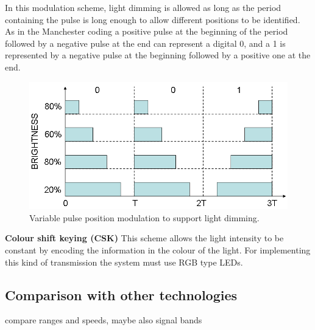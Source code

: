 In this modulation scheme, light dimming is allowed as long as the period containing the pulse is long enough to allow different positions to be identified. 
As in the Manchester coding a positive pulse at the beginning of the period followed by a negative pulse at the end can represent a digital 0, and a 1 is represented by a negative pulse at the beginning followed by a positive one at the end.\\
\newline
\begin{figure}[H]
\centering
\includegraphics[scale=0.3]{img/VPPM}
\caption{Variable pulse position modulation to support light dimming.}
\label{fig:ookmod}
\end{figure}
\textbf{Colour shift keying (CSK)}\newline
This scheme allows the light intensity to be constant by encoding the information in the colour of the light.
For implementing this kind of transmission the system must use RGB type LEDs.

\subsection{Comparison with other technologies}
compare ranges and speeds, maybe also signal bands